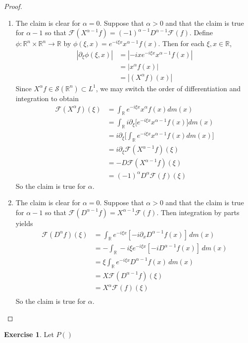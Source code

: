 \documentclass[12pt]{amsart}
\theoremstyle{definition}
\newtheorem{ex}[definition]{Exercise}
\newcommand{\p}{\partial}
\newcommand{\al}{\alpha}
\newcommand{\R}{\mathbb{R}}
\newcommand{\MF}{\mathcal{F}}
\newcommand{\MS}{\mathcal{S}}
\newcommand{\dm}{\, d m}
\begin{document}
	\begin{proof}\
		\begin{enumerate}
			\item The claim is clear for $\al = 0$. Suppose that $\al > 0$ and that the claim is true for $\al -1$ so that $\MF(X^{\al-1}f) = (-1)^{\al-1}D^{\al-1} \MF(f)$. Define $\phi:\R^n \times \R^n \rightarrow \R$ by $\phi(\xi, x) = e^{-i\xi x} x^{\al - 1}f(x)$. Then for each $\xi, x \in \R$, 
			\begin{align*}
				|\p_{\xi} \phi(\xi, x)|
				& = |-ix e^{-i\xi x} x^{\al - 1}f(x)| \\
				& = |x^{\al}f(x)| \\
				& = |(X^{\al}f)(x)|
			\end{align*}
			Since $X^{\al}f \in \MS(\R^n) \subset L^1$, we may switch the order of differentiation and integration to obtain 
			\begin{align*}
				\MF(X^{\al}f) (\xi)
				& = \int_{\R} e^{-i\xi x}x^{\al}f(x) dm(x) \\
				& = \int_{\R} i \p_{\xi}\bigg[ e^{-i\xi x}x^{\al-1}f(x) \bigg] dm(x) \\
				& = i \p_{\xi} \bigg[  \int_{\R} e^{-i\xi x}x^{\al-1}f(x) dm(x) \bigg] \\
				& = i \p_{\xi} \MF(X^{\al-1}f) (\xi) \\
				& = -D \MF(X^{\al-1}f)(\xi) \\
				& = (-1)^{\al}D^{\al} \MF(f) (\xi)
			\end{align*}
			So the claim is true for $\al$.
			\item The claim is clear for $\al = 0$. Suppose that $\al > 0$ and that the claim is true for $\al -1$ so that $\MF(D^{\al-1}f) = X^{\al-1} \MF(f)$. Then integration by parts yields 
			\begin{align*}
				\MF(D^{\al}f)(\xi)
				& = \int_{\R} e^{-i \xi x} [-i \p_x D^{\al-1}f(x)] \dm(x) \\
				&= - \int_{\R} -i \xi e^{-i \xi x} [-iD^{\al-1}f(x)] \dm(x) \\
				&= \xi \int_{\R}   e^{-i \xi x} D^{\al-1}f(x) \dm(x) \\
				&= X \MF(D^{\al-1}f)(\xi) \\
				&= X^{\al} \MF(f)(\xi) \\
			\end{align*}
			So the claim is true for $\al$.  
		\end{enumerate}
	\end{proof}

	\begin{ex}
		Let $P()$
	\end{ex}
\end{document}
